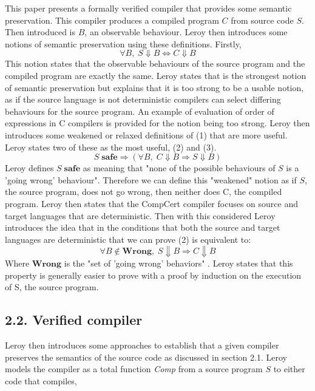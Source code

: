 \documentclass[11pt, a4paper, twoside, openright, twocolumn]{report}
\begin{document}
This paper \cite{Leroy:2009} presents a formally verified compiler that provides some semantic preservation.
This compiler produces a compiled program $C$ from source code $S$. Then introduced is $B$, an observable behaviour.
Leroy then introduces some notions of semantic preservation using these definitions. Firstly,
\begin{equation}
\forall B, \; S \Downarrow B \Longleftrightarrow C \Downarrow B
\end{equation}
This notion states that the observable behaviours of the source program and the compiled program are exactly the same.
Leroy states that is the strongest notion of semantic preservation but explains that it is too strong to be a usable notion,
as if the source language is not deterministic compilers can select differing behaviours for the source program. An example of
evaluation of order of expressions in C compilers is provided for the notion being too strong.
Leroy then introduces some weakened or relaxed definitions of (1) that are more useful.
Leroy states two of these as the most useful, (2) and (3).
\begin{equation}
S \; \textbf{safe} \Longrightarrow (\forall B, \; C \Downarrow B \Longrightarrow S \Downarrow B)
\end{equation}
Leroy defines $S \; \textbf{safe}$ as meaning that "none of the possible behaviours of $S$ is a 'going wrong' behaviour"\cite{Leroy:2009}. Therefore we can 
define this "weakened" notion as if $S$, the source program, does not go wrong, then neither does C, the compiled program.
Leroy then states that the CompCert compiler focuses on source and target languages that are deterministic. Then with this considered Leroy introduces
the idea that in the conditions that both the source and target languages are deterministic that we can prove (2) is equivalent to:
\begin{equation}
\forall B \notin \textbf{Wrong}, \; S \Downarrow B \Longrightarrow C \Downarrow B
\end{equation}
Where $\textbf{Wrong}$ is the "set of 'going wrong' behaviors" \cite{Leroy:2009}. Leroy states that this property is generally easier to prove
with a proof by induction on the execution of S, the source program. 
\subsection*{2.2. Verified compiler} 
Leroy then introduces some approaches to establish that a given compiler preserves the semantics of the source code as discussed in section 2.1. 
Leroy models the compiler as a total function \textit{Comp} from a source program $S$ to either code that compiles,
\end{document}
